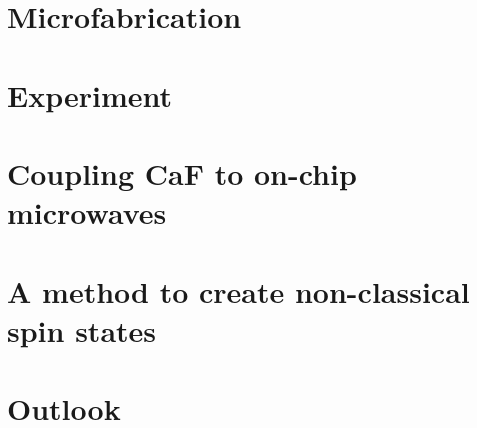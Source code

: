 \documentclass[a4paper, 12pt, twoside]{report}
\newcommand{\CaF}{CaF}
\begin{document}
\chapter{Microfabrication}
\label{fab}


\chapter{Experiment}
\label{experiment}

\chapter{Coupling \CaF{} to on-chip microwaves}
\label{mws}


\chapter{A method to create non-classical spin states}
\label{squeeze}


\chapter{Outlook}
\label{outlook}


\clearpage

\printbibliography
\end{document}
